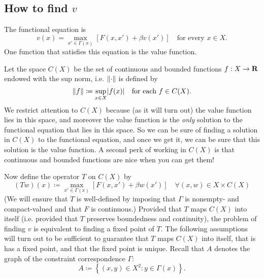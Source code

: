 \documentclass[11pt,letterpaper,reqno,oneside]{article}
\begin{document}
\subsection{How to find \texorpdfstring{$v$}{v}}
\label{sec:28Sep2015:how_to_find_v}

The functional equation is
%
\begin{equation*}
	v(x) = \max_{x' \in \Gamma(x)} \left[ F(x,x') + \beta v(x') \right] 
	\quad\text{for every $x \in X$.}
\end{equation*}
%
One function that satisfies this equation is the value function.

Let the space $C(X)$ be the set of continuous and bounded functions $f : X \to \mathbf{R}$ endowed with the sup norm, i.e. $\lVert\cdot\rVert$ is defined by
%
\begin{equation*}
	\lVert f \rVert \coloneqq \sup_{x \in X} \lvert f(x) \rvert
	\quad\text{for each $f \in C(X)$} .
\end{equation*}
%
We restrict attention to $C(X)$ because (as it will turn out) the value function lies in this space, and moreover the value function is the \emph{only} solution to the functional equation that lies in this space. So we can be sure of finding a solution in $C(X)$ to the functional equation, and once we get it, we can be sure that this solution is the value function. A second perk of working in $C(X)$ is that continuous and bounded functions are nice when you can get them!

Now define the operator $T$ on $C(X)$ by
%
\begin{equation}
	(Tw)(x) \coloneqq \max_{x' \in \Gamma(x)} \left[ F(x,x') + \beta w(x') \right] 
	\quad \forall (x,w) \in X \times C(X)
	\label{eq:operator_T}
\end{equation}
%
(We will ensure that $T$ is well-defined by imposing that $\Gamma$ is nonempty- and compact-valued and that $F$ is continuous.) Provided that $T$ maps $C(X)$ into itself (i.e. provided that $T$ preserves boundedness and continuity), the problem of finding $v$ is equivalent to finding a fixed point of $T$. The following assumptions will turn out to be sufficient to guarantee that $T$ maps $C(X)$ into itself, that is has a fixed point, and that the fixed point is unique. Recall that $A$ denotes the graph of the constraint correspondence $\Gamma$:
%
\begin{equation*}
	A \coloneqq \left\{
	(x,y) \in X^2 : y \in \Gamma(x) \right\} .
\end{equation*}
\end{document}

